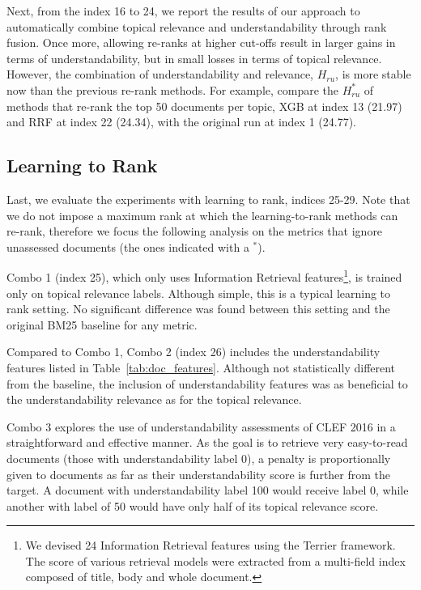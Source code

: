 Next, from the index 16 to 24, we report the results of our approach to automatically combine topical relevance and understandability through rank fusion.
Once more, allowing re-ranks at higher cut-offs result in larger gains in terms of understandability, but in small losses in terms of topical relevance.
However, the combination of understandability and relevance, $H_{ru}$, is more stable now than the previous re-rank methods. 
For example, compare the $H_{ru}^*$ of methods that re-rank the top 50 documents per topic, XGB at index 13 (21.97) and RRF at index 22 (24.34), with the original run at index 1 (24.77).

\subsection{Learning to Rank}
\label{results:ltr}

Last, we evaluate the experiments with learning to rank, indices 25-29. Note that we do not impose a maximum rank at which the learning-to-rank methods can re-rank, therefore we focus the following analysis on the metrics that ignore unassessed documents (the ones indicated with a $^*$).

Combo 1 (index 25), which only uses Information Retrieval features\footnote{We devised 24 Information Retrieval features using the Terrier framework. The score of various retrieval models were extracted from a multi-field index composed of title, body and whole document.}, is trained only on topical relevance labels. Although simple, this is a typical learning to rank setting.
No significant difference was found between this setting and the original BM25 baseline for any metric.

Compared to Combo 1, Combo 2 (index 26) includes the understandability features listed in Table~\ref{tab:doc_features}. Although not statistically different from the baseline, the inclusion of understandability features was as beneficial to the understandability relevance as for the topical relevance.

Combo 3 explores the use of understandability assessments of CLEF 2016 in a straightforward and effective manner. As the goal is to retrieve very easy-to-read documents (those with understandability label 0), a penalty is proportionally given to documents as far as their understandability score is further from the target. A document with understandability label 100 would receive label 0, while another with label of 50 would have only half of its topical relevance score.

